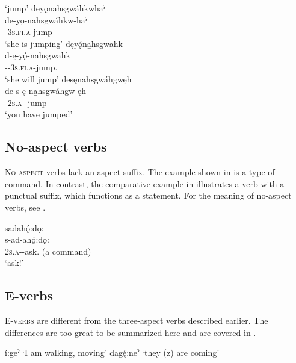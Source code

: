 \ea\label{ex:verbex92}  ‘jump’
\ea deyǫna̱hsgwáhkwhaˀ\\
\gll de-yǫ-na̱hsgwáhkw-haˀ\\
 {\dualic}-\textsc{3s.fi.a}-jump-{\habitual}\\
\glt `she is jumping'
\ex dęyǫ́na̱hsgwahk\\\label{ex:verbex92b}
\gll d-ę-yǫ́-na̱hsgwahk\\
 {\dualic}-{\future}-\textsc{3s.fi.a}-jump.{\zeropunctual}\\
\glt `she will jump'
\ex desęna̱hsgwáhgwęh\\
\gll de-s-ę-na̱hsgwáhgw-ęh\\
 {\dualic}-\textsc{2s.a}-{\semireflexive}-jump-{\stative}\\
\glt `you have jumped'
\z
\z



\subsection{No-aspect verbs} \label{No-aspect verbs}
\textsc{No-aspect} verbs lack an aspect suffix. The example shown in  is a type of command. In contrast, the comparative example in  illustrates a verb with a punctual suffix, which functions as a statement. For the meaning of no-aspect verbs, see .

\ea\label{ex:commandexample}
sadahǫ́:dǫ:\\\label{ex:commandexamplea}
\gll s-ad-ahǫ́:dǫ:\\
 \textsc{2s.a}-{\semireflexive}-ask.{\noaspect} (a command)\\
\glt `ask!'
\z


\subsection{E-verbs} \label{Verbs of motion}
\textsc{E-verbs}  are different from the three-aspect verbs described earlier. The differences are too great to be summarized here and are covered in .

\ea\label{ex:motionverbsagain}
\ea í:geˀ ‘I am walking, moving’ 
\ex dagę́:neˀ ‘they (z) are coming’ 
\z
\z


